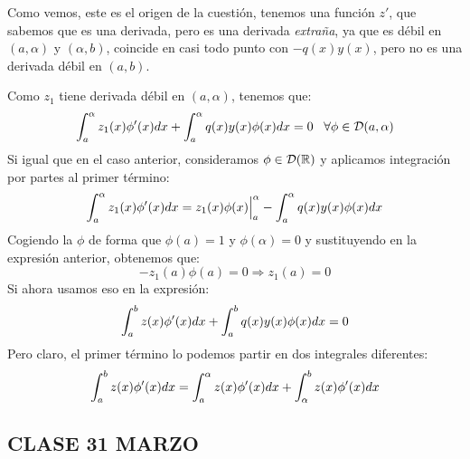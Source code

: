 Como vemos, este es el origen de la cuestión, tenemos una función $z'$, que sabemos que es una derivada, pero es una derivada \textit{extraña}, ya que es débil en $(a,\alpha)$ y $(\alpha,b)$, coincide en casi todo punto con $-q(x)y(x)$, pero no es una derivada débil en $(a,b)$. 

Como $z_1$ tiene derivada débil en $(a,\alpha)$, tenemos que:
\[
\displaystyle\int_{ a }^{ \alpha } z_1(x)\phi'(x)dx+\displaystyle\int_{ a }^{ \alpha } q(x)y(x)\phi(x)dx=0 \;\;\; \forall\phi\in\mathcal{D}(a,\alpha)
\] 
Si igual que en el caso anterior, consideramos $\phi\in\mathcal{D}(\mathbb{R})$ y aplicamos integración por partes al primer término:
\[
\displaystyle\int_{ a }^{ \alpha } z_1(x)\phi'(x)dx=z_1(x)\phi(x)\Big|_a^\alpha-\displaystyle\int_{ a }^{ \alpha } q(x)y(x)\phi(x)dx
\]
Cogiendo la $\phi$ de forma que $\phi(a)=1$ y $\phi(\alpha)=0$ y sustituyendo en la expresión anterior, obtenemos que:
\[
-z_1(a)\phi(a)=0 \Rightarrow z_1(a)=0
\]
Si ahora usamos eso en la expresión:
\[
\displaystyle\int_{ a }^{ b } z(x)\phi'(x)dx+\displaystyle\int_{ a }^{ b } q(x)y(x)\phi(x)dx=0
\]
Pero claro, el primer término lo podemos partir en dos integrales diferentes:
\[
\displaystyle\int_{ a }^{ b } z(x)\phi'(x)dx=\displaystyle\int_{ a }^{ \alpha } z(x)\phi'(x)dx+\displaystyle\int_{ \alpha }^{ b } z(x)\phi'(x)dx
\]

\subsection{CLASE 31 MARZO}

